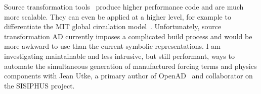 Source transformation tools~\citep{bischof1997adic,utke2008openad} produce higher performance code and are much more scalable.
They can even be applied at a higher level, for example to differentiate the MIT global circulation model~\citep{heimbach2005efficient}.
Unfortunately, source transformation AD currently imposes a complicated build process and would be more awkward to use than the current symbolic representations.
I am investigating maintainable and less intrusive, but still performant, ways to automate the simultaneous generation of manufactured forcing terms and physics components with Jean Utke, a primary author of OpenAD~\citep{openad-userman,utke2004openad} and collaborator on the SISIPHUS project.

